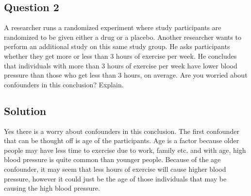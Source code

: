\documentclass[12pt,a4paper]{article}
\makeatletter
\newenvironment{folding}{\endgroup}{\begingroup \def \@currenvir{folding}\edef \@currenvline{\on@line}}
\makeatother
\begin{document}
	\begin{folding}
		\begin{centering}
			\subsection*{Question 2}
		\end{centering}
		\noindent
		A researcher runs a randomized experiment where study participants are randomized to be given either a drug or a placebo. Another researcher wants to perform an additional study on this same study group. He asks participants whether they get more or less than 3 hours of exercise per week. He concludes that individuals with more than 3 hours of exercise per week have lower blood pressure than those who get less than 3 hours, on average. Are you worried about confounders in this conclusion? Explain. \\
		\begin{centering}
			\subsection*{Solution}
		\end{centering}
		Yes there is a worry about confounders in this conclusion. The first confounder that can be thought off is age of the participants. Age is a factor because older people may have less time to exercise due to work, family etc. and with age, high blood pressure is quite common than younger people. Because of the age confounder, it may seem that less hours of exercise will cause higher blood pressure, however it could just be the age of those individuals that may be causing the high blood pressure.
	\newpage
	\end{folding}
\end{document}
